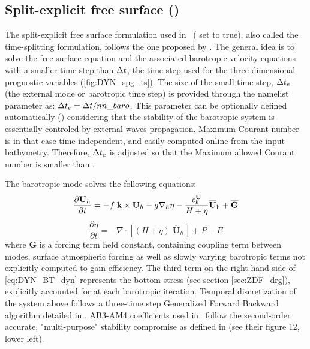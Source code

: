 \documentclass[../main/NEMO_manual]{subfiles}
\begin{document}
\subsection[Split-explicit free surface (\forcode{ln_dynspg_ts})]{Split-explicit free surface (\protect{})}
\label{subsec:DYN_spg_ts}

The split-explicit free surface formulation used in \NEMO\ ( set to true),
also called the time-splitting formulation, follows the one proposed by \citet{shchepetkin.mcwilliams_OM05}.
The general idea is to solve the free surface equation and the associated barotropic velocity equations with
a smaller time step than $\Delta t$, the time step used for the three dimensional prognostic variables
(\autoref{fig:DYN_spg_ts}).
The size of the small time step, $\Delta t_e$ (the external mode or barotropic time step) is provided through
the  namelist parameter as: $\Delta t_e = \Delta t / nn\_baro$.
This parameter can be optionally defined automatically () considering that
the stability of the barotropic system is essentially controled by external waves propagation.
Maximum Courant number is in that case time independent, and easily computed online from the input bathymetry.
Therefore, $\Delta t_e$ is adjusted so that the Maximum allowed Courant number is smaller than .

The barotropic mode solves the following equations:
\begin{equation}
  \label{eq:DYN_BT_dyn}
  \frac{\partial {\mathrm \overline{{\mathbf U}}_h} }{\partial t}=
  -f\;{\mathrm {\mathbf k}}\times {\mathrm \overline{{\mathbf U}}_h}
  -g\nabla _h \eta -\frac{c_b^{\textbf U}}{H+\eta} \mathrm {\overline{{\mathbf U}}_h} + \mathrm {\overline{\mathbf G}}
\end{equation}
\[
  \frac{\partial \eta }{\partial t}=-\nabla \cdot \left[ {\left( {H+\eta } \right) \; {\mathrm{\mathbf \overline{U}}}_h \,} \right]+P-E
\]
where $\mathrm {\overline{\mathbf G}}$ is a forcing term held constant, containing coupling term between modes,
surface atmospheric forcing as well as slowly varying barotropic terms not explicitly computed to gain efficiency.
The third term on the right hand side of \autoref{eq:DYN_BT_dyn} represents the bottom stress
(see section \autoref{sec:ZDF_drg}), explicitly accounted for at each barotropic iteration.
Temporal discretization of the system above follows a three-time step Generalized Forward Backward algorithm
detailed in \citet{shchepetkin.mcwilliams_OM05}.
AB3-AM4 coefficients used in \NEMO\ follow the second-order accurate,
"multi-purpose" stability compromise as defined in \citet{shchepetkin.mcwilliams_ibk09}
(see their figure 12, lower left).
\end{document}
